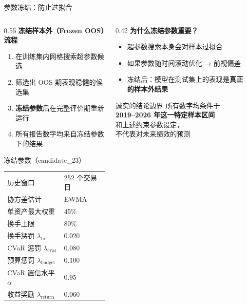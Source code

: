 \documentclass[aspectratio=169,11pt]{beamer}
\begin{document}
\begin{frame}{参数冻结：防止过拟合}
  \begin{columns}[T]
    \begin{column}{0.55\textwidth}
      \textbf{冻结样本外（Frozen OOS）流程}
      \begin{enumerate}
        \item 在训练集内网格搜索超参数候选
        \item 筛选出 OOS 期表现稳健的候选集
        \item \textbf{冻结参数}后在完整评价期重新运行
        \item 所有报告数字均来自冻结参数下的结果
      \end{enumerate}
      \vspace{0.4em}
      \begin{block}{冻结参数（candidate\_23）}
        \small
        \begin{tabular}{ll}
          历史窗口 & 252 个交易日 \\
          协方差估计 & EWMA \\
          单资产最大权重 & 45\% \\
          换手上限 & 80\% \\
          换手惩罚 $\lambda_{\mathrm{to}}$ & 0.020 \\
          CVaR 惩罚 $\lambda_{\mathrm{cvar}}$ & 0.080 \\
          预算惩罚 $\lambda_{\mathrm{budget}}$ & 0.100 \\
          CVaR 置信水平 $\alpha$ & 0.95 \\
          收益奖励 $\lambda_{\mathrm{return}}$ & 0.060 \\
        \end{tabular}
      \end{block}
    \end{column}
    \begin{column}{0.42\textwidth}
      \textbf{为什么冻结参数重要？}
      \begin{itemize}
        \item 超参数搜索本身会对样本过拟合
        \item 如果参数随时间滚动优化 → 前视偏差
        \item 冻结后：模型在测试集上的表现是\textbf{真正的样本外结果}
      \end{itemize}
      \vspace{0.6em}
      \begin{alertblock}{诚实的结论边界}
        所有数字均条件于\\
        \textbf{2019--2026 年这一特定样本区间}\\
        和上述约束参数设定，\\
        不代表对未来绩效的预测
      \end{alertblock}
    \end{column}
  \end{columns}
\end{frame}
\end{document}
